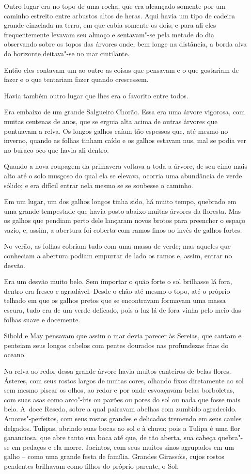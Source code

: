 Outro lugar era no topo de uma rocha, que era alcançado somente por um
caminho estreito entre arbustos altos de heras. Aqui havia um tipo de
cadeira grande cinzelada na terra, em que cabia somente os dois; e para
ali eles frequentemente levavam seu almoço e sentavam"-se pela metade do
dia observando sobre os topos das árvores onde, bem longe na distância,
a borda alva do horizonte deitava"-se no mar cintilante.

Então eles contavam um ao outro as coisas que pensavam e o que gostariam
de fazer e o que tentariam fazer quando crescessem.

Havia também outro lugar que lhes era o favorito entre todos.

Era embaixo de um grande Salgueiro Chorão. Essa era uma árvore vigorosa,
com muitas centenas de anos, que se erguia alta acima de outras árvores
que pontuavam a relva. Os longos galhos caíam tão espessos que, até
mesmo no inverno, quando as folhas tinham caído e os galhos estavam nus,
mal se podia ver no buraco oco que havia ali dentro.

Quando a nova roupagem da primavera voltava a toda a árvore, de seu cimo
mais alto até o solo musgoso do qual ela se elevava, ocorria uma
abundância de verde sólido; e era difícil entrar nela mesmo se se
soubesse o caminho.

Em um lugar, um dos galhos longos tinha sido, há muito tempo, quebrado
em uma grande tempestade que havia posto abaixo muitas árvores da
floresta. Mas os galhos que pendiam perto dele lançaram novos brotos
para preencher o espaço vazio, e, assim, a abertura foi coberta com
ramos finos ao invés de galhos fortes.

No verão, as folhas cobriam tudo com uma massa de verde; mas aqueles que
conheciam a abertura podiam empurrar de lado os ramos e, assim, entrar
no desvão.

Era um desvão muito belo. Sem importar o quão forte o sol brilhasse lá
fora, dentro era fresco e agradável. Desde o chão até mesmo o topo, até
o próprio telhado em que os galhos pretos que se encontravam formavam
uma massa escura, tudo era de um verde delicado, pois a luz lá de fora
vinha pelo meio das folhas suave e docemente.

Sibold e May pensavam que assim o mar devia parecer às Sereias, que
cantam e penteiam seus longos cabelos com pentes dourados nas
profundezas frias do oceano.

Na relva ao redor dessa grande árvore havia muitos canteiros de belas
flores. Ásteres, com seus rostos largos de muitas cores, olhando fixos
diretamente ao sol sem mesmo piscar os olhos, ao redor e por onde
esvoaçavam belas borboletas, com suas asas como arco"-íris ou pavões ou
pores do sol ou nada que fosse mais belo. A~doce Reseda, sobre a qual
pairavam abelhas com zumbido agradecido. Amores"-perfeitos, com seus
rostos grandes e delicados tremendo em seus caules delgados. Tulipas,
abrindo suas bocas ao sol e à chuva; pois a Tulipa é uma flor
gananciosa, que abre tanto sua boca até que, de tão aberta, sua cabeça
quebra"-se em pedaços e ela morre. Jacintos, com seus muitos sinos
agrupados em um galho -- como uma grande festa de família. Grandes
Girassóis, cujos rostos pendentes brilhavam como filhos do próprio
parente, o Sol.

